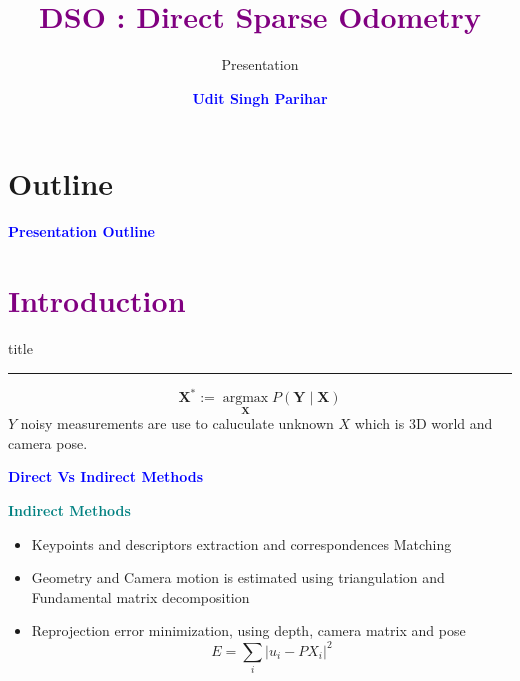 \documentclass[aspectratio=169]{beamer}
\title{\textbf{\textcolor{purple}{DSO : Direct Sparse Odometry}}}
\subtitle{Presentation}
\author{\footnotesize \textbf{\textcolor{blue}{\Large Udit Singh Parihar}} }
\date{} %
\begin{document}
{ 
\frame{\titlepage}}

\section*{Outline}
\begin{frame}
		{\textcolor{blue}{\textbf{Presentation Outline}}}\tableofcontents
\end{frame}

\section{\textbf{\textcolor{purple}{Introduction}}}
		\begin{frame}[plain]
				\vfill
			\centering
			\begin{beamercolorbox}[sep=8pt,center,shadow=true,rounded=true]{title}
				\insertsectionhead\par%
				\color{oxfordblue}\noindent\rule{10cm}{1pt}
			\end{beamercolorbox}
			\vfill

			$$
				\mathbf{X}^*:=\underset{\mathbf{X}}{\operatorname{argmax}} P(\mathbf{Y} \mid \mathbf{X})
			$$
		$Y$ noisy measurements are use to caluculate unknown $X$ which is 3D world and camera pose.
	\end{frame}


\begin{frame}{\textcolor{blue}{\textbf{Direct Vs Indirect Methods}}}
	\vspace{-0.5cm}

	
	\begin{block}{\textbf{\textcolor{teal}{Indirect Methods}}}
	\begin{itemize}
			\item Keypoints and descriptors extraction and correspondences Matching
			\item Geometry and Camera motion is estimated using triangulation and Fundamental matrix decomposition
			\item Reprojection error minimization, using depth, camera matrix and pose
			\begin{equation}
				E = \sum_{i} \left|u_i - P X_i\right|^2
			\end{equation}
		\end{itemize}
	

	\end{block}

\end{frame}
\end{document}
